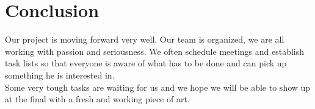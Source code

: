 \documentclass[12pt]{report}
\begin{document}
% 
% 










 






\chapter*{Conclusion}

Our project is moving forward very well. Our team is organized, we are all
working with passion and seriousness. We often schedule meetings and establish
task lists so that everyone is aware of what has to be done and can pick up
something he is interested in. \\

Some very tough tasks are waiting for us and we hope we will be able to show up
at the final with a fresh and working piece of art.
\end{document}
